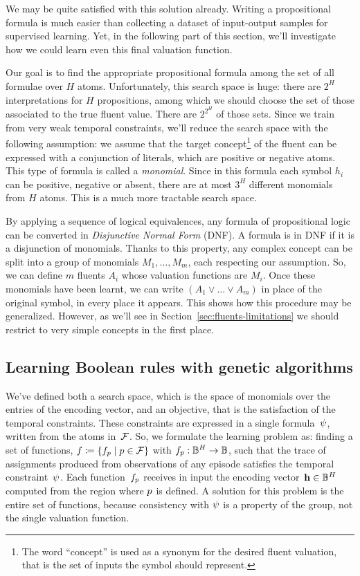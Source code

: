 We may be quite satisfied with this solution already. Writing a propositional
formula is much easier than collecting a dataset of input-output samples for
supervised learning. Yet, in the following part of this section, we'll
investigate how we could learn even this final valuation function.

Our goal is to find the appropriate propositional formula among the set of all
formulae over $H$ atoms. Unfortunately, this search space is huge: there are
$2^H$ interpretations for $H$ propositions, among which we should choose the
set of those associated to the true fluent value. There are $2^{2^H}$ of those
sets. Since we train from very weak temporal constraints, we'll reduce the
search space with the following assumption: we assume that the target
concept\footnote{The word ``concept'' is used as a synonym for the desired
fluent valuation, that is the set of inputs the symbol should represent.} of
the fluent can be expressed with a conjunction of literals, which are positive
or negative atoms. This type of formula is called a \emph{monomial}. Since in
this formula each symbol $h_i$ can be positive, negative or absent, there are
at most $3^H$ different monomials from $H$ atoms. This is a much more
tractable search space.

By applying a sequence of logical equivalences, any formula of propositional
logic can be converted in \emph{Disjunctive Normal Form}
(DNF). A formula is in DNF if it is
a disjunction of monomials. Thanks to this property, any complex concept can
be split into a group of monomials $M_1, \dots, M_m$, each respecting our
assumption. So, we can define $m$ fluents $A_i$ whose valuation functions are
$M_i$. Once these monomials have been learnt, we can write $(A_1 \lor \dots
\lor A_m)$ in place of the original symbol, in every place it appears. This
shows how this procedure may be generalized. However, as we'll see in
Section~\ref{sec:fluents-limitations} we should restrict to very simple
concepts in the first place.


\subsection{Learning Boolean rules with genetic algorithms}

\label{sec:ga-for-bools}

We've defined both a search space, which is the space of monomials over the
entries of the encoding vector, and an objective, that is the satisfaction of
the temporal constraints. These constraints are expressed in a single \ldl{}
formula~$\psi$, written from the atoms in~$\mathcal{F}$. So, we formulate
the learning problem as: finding a set of functions, $f \coloneqq
\{f_p \mid p \in \mathcal{F}\}$ with $f_p: \mathbb{B}^H \to \mathbb{B}$,
such that the trace of assignments produced from observations of any episode
satisfies the temporal constraint~$\psi$. Each function~$f_p$
receives in input the encoding vector~$\mathbf{h} \in \mathbb{B}^H$ computed from the region
where $p$ is defined. A solution for this problem is the entire set of
functions, because consistency with $\psi$ is a property of the group,
not the single valuation function.

